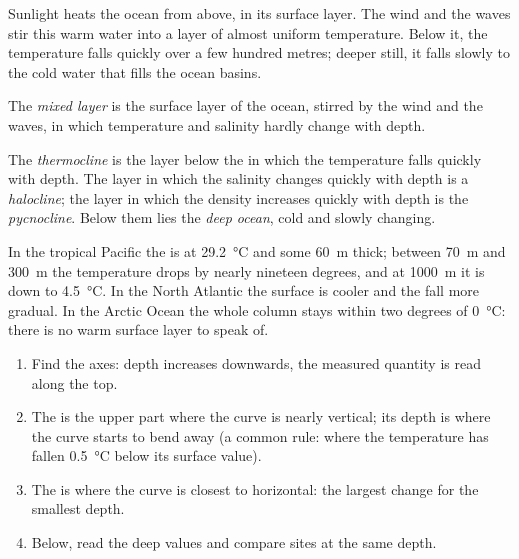 Sunlight heats the ocean from above, in its surface layer. The wind and the waves stir this warm water into a layer of
almost uniform temperature. Below it, the temperature falls quickly over a
few hundred metres; deeper still, it falls slowly to the cold water that
fills the ocean basins.

\begin{definition}\label{def:g10:layered-ocean:mixed-layer}
The \emph{mixed layer} is the surface layer of the ocean,
stirred by the wind and the waves, in which temperature and salinity hardly
change with depth.
\end{definition}

\begin{definition}\label{def:g10:layered-ocean:thermocline}
The \emph{thermocline} is the layer below the  in
which the temperature falls quickly with depth. The layer in which the
salinity changes quickly with depth is a \emph{halocline};
the layer in which the density increases quickly with depth is the
\emph{pycnocline}. Below them lies the \emph{deep
ocean}, cold and slowly changing.
\end{definition}

In the tropical Pacific the  is at \qty{29.2}{\degreeCelsius} and
some \qty{60}{m} thick; between \qty{70}{m} and \qty{300}{m} the temperature
drops by nearly nineteen degrees, and at \qty{1000}{m} it is down to
\qty{4.5}{\degreeCelsius}. In the North Atlantic the surface is cooler and
the fall more gradual. In the Arctic Ocean the whole column stays within two
degrees of \qty{0}{\degreeCelsius}: there is no warm surface layer to speak
of.

\begin{method}\label{met:g10:layered-ocean:profile}
\begin{enumerate}
  \item Find the axes: depth increases downwards, the measured quantity is
        read along the top.
  \item The  is the upper part where the curve is nearly
        vertical; its depth is where the curve starts to bend away (a common
        rule: where the temperature has fallen \qty{0.5}{\degreeCelsius}
        below its surface value).
  \item The  is where the curve is closest to horizontal: the
        largest change for the smallest depth.
  \item Below, read the deep values and compare sites at the same depth.
\end{enumerate}
\end{method}

